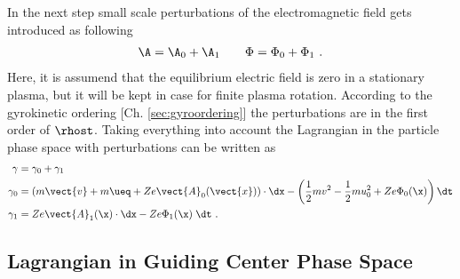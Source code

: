 In the next step small scale perturbations of the electromagnetic field gets introduced as following
\begin{gather}
    \A = \A_0 + \A_1 \qquad \Phi = \Phi_0 + \Phi_1~.
    \label{eq:electromagneticPertubation}
\end{gather}
Here, it is assumend that the equilibrium electric field is zero in a stationary plasma, but it will be kept in case for finite plasma rotation. According to the gyrokinetic ordering [Ch. \ref{sec:gyroordering}] the perturbations are in the first order of $\rhost$. Taking everything into account the Lagrangian in the particle phase space with perturbations can be written as
\begin{gather}
    \begin{aligned}
        \gamma   &= \gamma_0 + \gamma_1 \\
        \gamma_0 &= \left(m\vect{v} + m\ueq + Ze\vect{A}_0(\vect{x}) \right) \cdot \dx - \left(\frac{1}{2}mv^2 - \frac{1}{2}mu_0^2 + Ze\Phi_0(\x)\right) \dt \\
        \gamma_1 &= Ze\vect{A}_1(\x) \cdot \dx - Ze \Phi_1(\x)\;\dt~.
    \end{aligned}
    \label{eq:particlePertubationLagrangian}
\end{gather}

\subsection{Lagrangian in Guiding Center Phase Space}
\label{sub:guidingcenterLagrangian}

